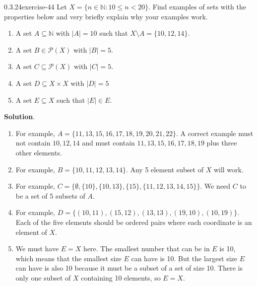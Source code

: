 \documentclass[twoside,11pt,]{book}
\numberwithin{equation}{chapter}
\newcommand{\N}{\mathbb N}
\newcommand{\pow}{\mathcal P}
\newcommand{\st}{:}
\newcommand{\lt}{<}
\begin{document}
\begin{divisionsolution}{0.3.24}{}{exercise-44}%
\hypertarget{p-757}{}%
Let \(X = \{n \in \N \st 10 \le n \lt 20\}\). Find examples of sets with the properties below and very briefly explain why your examples work.\leavevmode%
\begin{enumerate}[label=(\alph*)]
\item\hypertarget{li-672}{}\hypertarget{p-758}{}%
A set \(A \subseteq \N\) with \(|A| = 10\) such that \(X \setminus A = \{10, 12, 14\}\).%
\item\hypertarget{li-673}{}\hypertarget{p-759}{}%
A set \(B \in \pow(X)\) with \(|B| = 5\).%
\item\hypertarget{li-674}{}\hypertarget{p-760}{}%
A set \(C \subseteq \pow(X)\) with \(|C| = 5\).%
\item\hypertarget{li-675}{}\hypertarget{p-761}{}%
A set \(D \subseteq X \times X\) with \(|D| = 5\)%
\item\hypertarget{li-676}{}\hypertarget{p-762}{}%
A set \(E \subseteq X\) such that \(|E| \in E\).%
\end{enumerate}
%
\par\smallskip%
\noindent\textbf{Solution}.\quad%
\hypertarget{p-763}{}%
\leavevmode%
\begin{enumerate}[label=(\alph*)]
\item\hypertarget{li-677}{}\hypertarget{p-764}{}%
For example, \(A = \{11, 13, 15, 16, 17, 18, 19, 20, 21, 22\}\). A correct example must not contain \(10, 12, 14\) and must contain \(11, 13, 15, 16, 17, 18, 19\) plus three other elements.%
\item\hypertarget{li-678}{}\hypertarget{p-765}{}%
For example, \(B = \{10, 11, 12, 13, 14\}\). Any 5 element subset of \(X\) will work.%
\item\hypertarget{li-679}{}\hypertarget{p-766}{}%
For example, \(C = \{\emptyset, \{10\}, \{10, 13\}, \{15\}, \{11, 12, 13, 14, 15\}\}\). We need \(C\) to be a set of 5 subsets of \(A\).%
\item\hypertarget{li-680}{}\hypertarget{p-767}{}%
For example, \(D = \{(10,11), (15,12), (13,13), (19,10), (10,19)\}\). Each of the five elements should be ordered pairs where each coordinate is an element of \(X\).%
\item\hypertarget{li-681}{}\hypertarget{p-768}{}%
We must have \(E = X\) here. The smallest number that can be in \(E\) is 10, which means that the smallest size \(E\) can have is 10. But the largest size \(E\) can have is also 10 because it must be a subset of a set of size 10. There is only one subset of \(X\) containing 10 elements, so \(E = X\).%
\end{enumerate}
%
\end{divisionsolution}%
\end{document}
